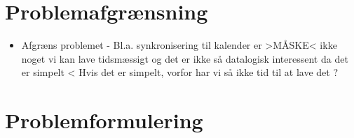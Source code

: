 


\section{Problemafgrænsning}
\begin{itemize}
\item Afgræns problemet - Bl.a. synkronisering til kalender er >MÅSKE< ikke noget vi kan lave tidsmæssigt og det er ikke så datalogisk interessent da det er simpelt < Hvis det er simpelt, vorfor har vi så ikke tid til at lave det ?

\end{itemize}


\section{Problemformulering}